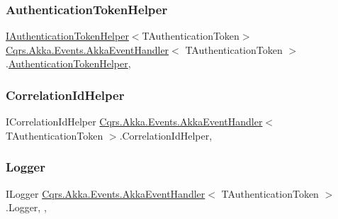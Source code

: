 \subsubsection{\texorpdfstring{Authentication\+Token\+Helper}{AuthenticationTokenHelper}}
{\footnotesize\ttfamily \hyperlink{interfaceCqrs_1_1Authentication_1_1IAuthenticationTokenHelper}{I\+Authentication\+Token\+Helper}$<$T\+Authentication\+Token$>$ \hyperlink{classCqrs_1_1Akka_1_1Events_1_1AkkaEventHandler}{Cqrs.\+Akka.\+Events.\+Akka\+Event\+Handler}$<$ T\+Authentication\+Token $>$.\hyperlink{classCqrs_1_1Authentication_1_1AuthenticationTokenHelper}{Authentication\+Token\+Helper}\hspace{0.3cm}{\ttfamily [get]}, {\ttfamily [protected]}}

\mbox{\label{classCqrs_1_1Akka_1_1Events_1_1AkkaEventHandler_a711ada6cc5e9fea454983378f6d5f109}} 
\subsubsection{\texorpdfstring{Correlation\+Id\+Helper}{CorrelationIdHelper}}
{\footnotesize\ttfamily I\+Correlation\+Id\+Helper \hyperlink{classCqrs_1_1Akka_1_1Events_1_1AkkaEventHandler}{Cqrs.\+Akka.\+Events.\+Akka\+Event\+Handler}$<$ T\+Authentication\+Token $>$.Correlation\+Id\+Helper\hspace{0.3cm}{\ttfamily [get]}, {\ttfamily [protected]}}

\mbox{\label{classCqrs_1_1Akka_1_1Events_1_1AkkaEventHandler_af9ccf9b06321f7cbb21934e83005346e}} 
\subsubsection{\texorpdfstring{Logger}{Logger}}
{\footnotesize\ttfamily I\+Logger \hyperlink{classCqrs_1_1Akka_1_1Events_1_1AkkaEventHandler}{Cqrs.\+Akka.\+Events.\+Akka\+Event\+Handler}$<$ T\+Authentication\+Token $>$.Logger\hspace{0.3cm}{\ttfamily [get]}, {\ttfamily [set]}, {\ttfamily [protected]}}

